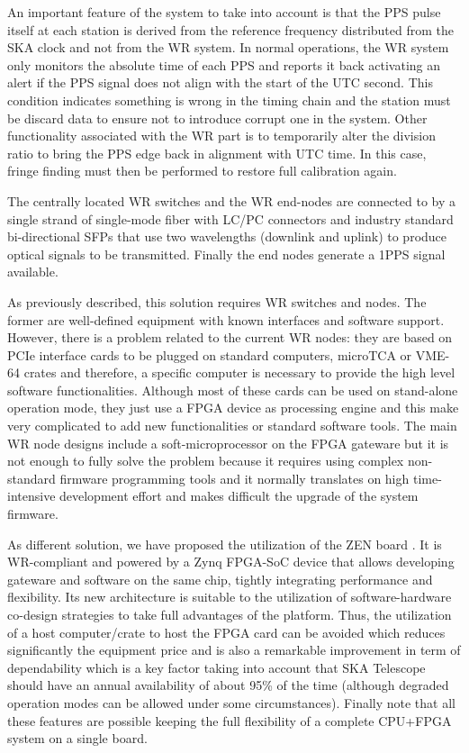  
An important feature of the system to take into account is that the PPS pulse itself at each station is derived from the reference frequency distributed from the SKA clock and not from the WR system. In normal operations, the WR system only monitors the absolute time of each PPS and reports it back activating an alert if the PPS signal does not align with the start of the UTC second. This condition indicates something is wrong in the timing chain and the station must be discard data to ensure not to introduce corrupt one in the system. Other functionality associated with the WR part is to temporarily alter the division ratio to bring the PPS edge back in alignment with UTC time. In this case, fringe finding must then be performed to restore full calibration again.

The centrally located WR switches and the WR end-nodes are connected to by a 
single strand of single-mode fiber with LC/PC connectors and industry standard 
bi-directional SFPs that use two wavelengths (downlink and uplink) to produce 
optical signals to be transmitted. Finally the end nodes generate a 1PPS signal available. 

As previously described, this solution requires WR switches and nodes. The 
former are well-defined equipment with known interfaces and software support. 
However, there is a problem related to the current WR nodes: they are based on 
PCIe interface cards to be plugged on standard computers, microTCA or VME-64 
crates and therefore, a specific computer is necessary to provide the high 
level software functionalities. Although most of these cards can be used on 
stand-alone operation mode, they just use a FPGA device as processing engine 
and this make very complicated to add new functionalities or standard software 
tools. The main WR node designs include a soft-microprocessor on the FPGA gateware but it is not 
enough to fully solve the problem because it requires using complex 
non-standard firmware programming tools and it normally translates on high 
time-intensive development effort and makes difficult the upgrade of the system 
firmware.

As different solution, we have proposed the utilization of the ZEN board 
\cite{sevensols:wr_zen}. It is WR-compliant and powered by a Zynq FPGA-SoC device \cite{xilinx:zynq} that allows developing 
gateware and software on the same chip, tightly integrating performance and 
flexibility. Its new architecture is suitable to the utilization of 
software-hardware co-design strategies to take full advantages of the platform. 
Thus, the utilization of a host computer/crate to host the FPGA card can be avoided which reduces significantly the equipment price and is also a remarkable improvement in term of dependability which is a key factor taking into account that SKA Telescope should have an annual availability of about 95\% of the time (although degraded operation modes can be allowed under some circumstances).
Finally note that all these features are possible keeping the full flexibility of a complete CPU+FPGA system on a single board. 

